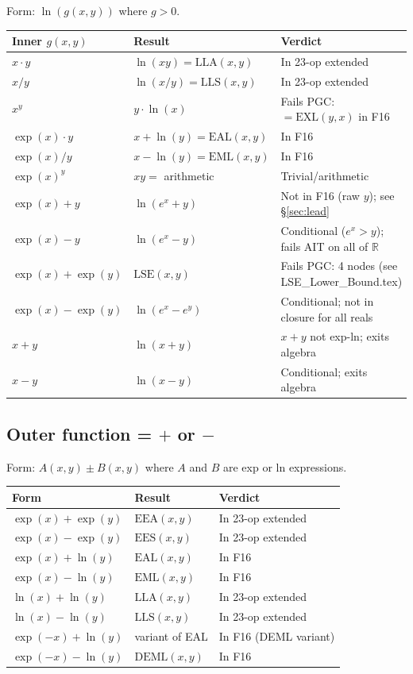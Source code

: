 \documentclass[11pt]{article}
\begin{document}
Form: $\ln(g(x,y))$ where $g > 0$.

\begin{center}
\renewcommand{\arraystretch}{1.2}
\begin{tabular}{lll}
\toprule
Inner $g(x,y)$ & Result & Verdict \\
\midrule
$x \cdot y$ & $\ln(xy) = \mathrm{LLA}(x,y)$ & In 23-op extended \\
$x / y$ & $\ln(x/y) = \mathrm{LLS}(x,y)$ & In 23-op extended \\
$x^y$ & $y \cdot \ln(x)$ & Fails PGC: $= \mathrm{EXL}(y,x)$ in F16 \\
$\exp(x) \cdot y$ & $x + \ln(y) = \mathrm{EAL}(x,y)$ & In F16 \\
$\exp(x) / y$ & $x - \ln(y) = \mathrm{EML}(x,y)$ & In F16 \\
$\exp(x)^y$ & $xy = $ arithmetic & Trivial/arithmetic \\
$\exp(x) + y$ & $\ln(e^x + y)$ & Not in F16 (raw $y$); see \S\ref{sec:lead} \\
$\exp(x) - y$ & $\ln(e^x - y)$ & Conditional ($e^x > y$); fails AIT on all of $\mathbb{R}$ \\
$\exp(x) + \exp(y)$ & $\mathrm{LSE}(x,y)$ & Fails PGC: 4 nodes (see LSE\_Lower\_Bound.tex) \\
$\exp(x) - \exp(y)$ & $\ln(e^x - e^y)$ & Conditional; not in closure for all reals \\
$x + y$ & $\ln(x+y)$ & $x+y$ not exp-ln; exits algebra \\
$x - y$ & $\ln(x-y)$ & Conditional; exits algebra \\
\bottomrule
\end{tabular}
\end{center}

\subsection{Outer function = $+$ or $-$}

Form: $A(x,y) \pm B(x,y)$ where $A$ and $B$ are exp or ln expressions.

\begin{center}
\renewcommand{\arraystretch}{1.2}
\begin{tabular}{lll}
\toprule
Form & Result & Verdict \\
\midrule
$\exp(x) + \exp(y)$ & $\mathrm{EEA}(x,y)$ & In 23-op extended \\
$\exp(x) - \exp(y)$ & $\mathrm{EES}(x,y)$ & In 23-op extended \\
$\exp(x) + \ln(y)$ & $\mathrm{EAL}(x,y)$ & In F16 \\
$\exp(x) - \ln(y)$ & $\mathrm{EML}(x,y)$ & In F16 \\
$\ln(x) + \ln(y)$ & $\mathrm{LLA}(x,y)$ & In 23-op extended \\
$\ln(x) - \ln(y)$ & $\mathrm{LLS}(x,y)$ & In 23-op extended \\
$\exp(-x) + \ln(y)$ & variant of EAL & In F16 (DEML variant) \\
$\exp(-x) - \ln(y)$ & $\mathrm{DEML}(x,y)$ & In F16 \\
\bottomrule
\end{tabular}
\end{center}
\end{document}
